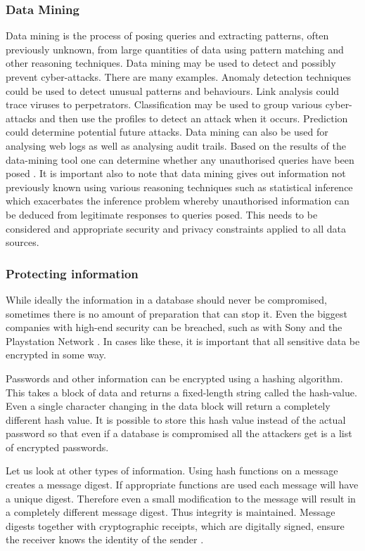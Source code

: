 \documentclass[11pt, twocolumn]{article}
\begin{document}
\subsubsection{Data Mining}
Data mining is the process of posing queries and extracting patterns, often previously unknown, from large quantities of data using pattern matching and other reasoning techniques.  Data mining may be used to detect and possibly prevent cyber-attacks.  There are many examples.  Anomaly detection techniques could be used to detect unusual patterns and behaviours.  Link analysis could trace viruses to perpetrators.  Classification may be used to group various cyber-attacks and then use the profiles to detect an attack when it occurs.  Prediction could determine potential future attacks.  Data mining can also be used for analysing web logs as well as analysing audit trails.  Based on the results of the data-mining tool one can determine whether any unauthorised queries have been posed \cite{Thur}.  It is important also to note that data mining gives out information not previously known using various reasoning techniques such as statistical inference which exacerbates the inference problem whereby unauthorised information can be deduced from legitimate responses to queries posed.  This needs to be considered and appropriate security and privacy constraints applied to all data sources.

\subsubsection{Protecting information}
While ideally the information in a database should never be compromised, sometimes there is no amount of preparation that can stop it.  Even the biggest companies with high-end security can be breached, such as with Sony and the Playstation Network \cite{sony}.  In cases like these, it is important that all sensitive data be encrypted in some way.

Passwords and other information can be encrypted using a hashing algorithm.  This takes a block of data and returns a fixed-length string called the hash-value.  Even a single character changing in the data block will return a completely different hash value.  It is possible to store this hash value instead of the actual password so that even if a database is compromised all the attackers get is a list of encrypted passwords.

Let us look at other types of information.  Using hash functions on a message creates a message digest.  If appropriate functions are used each message will have a unique digest.  Therefore even a small modification to the message will result in a completely different message digest.  Thus integrity is maintained.  Message digests together with cryptographic receipts, which are digitally signed, ensure the receiver knows the identity of the sender \cite{Thur}.
\end{document}
